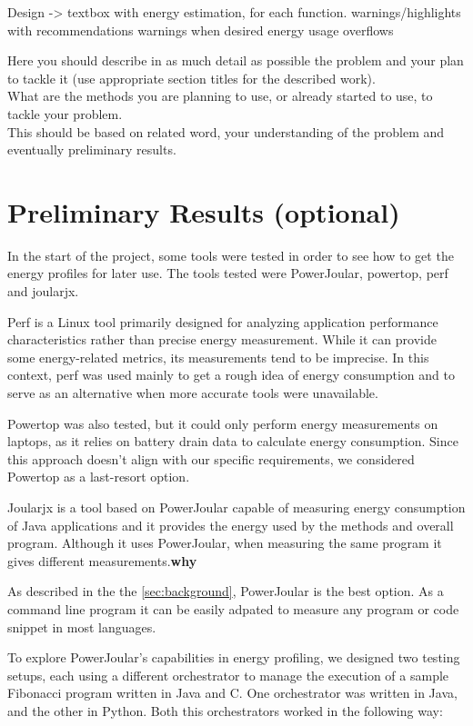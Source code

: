 \documentclass[sigplan]{acmart}
\begin{document}
Design -> textbox with energy estimation, for each function. 
          warnings/highlights with recommendations
          warnings when desired energy usage overflows 


Here you should describe in as much detail as possible the problem and your plan to tackle it (use appropriate section titles for the described work). \\

What are the methods you are planning to use, or already started to use, to tackle your problem. \\

This should be based on related word, your understanding of the problem and eventually preliminary results.

\section{Preliminary Results (optional)} \label{sec:preliminaryresults}

In the start of the project, some tools were tested in order to see how to get the energy profiles for later use. The tools tested were PowerJoular, powertop, perf and joularjx.

Perf is a Linux tool primarily designed for analyzing application performance characteristics rather than precise energy measurement. While it can provide some energy-related metrics, its measurements tend to be imprecise. In this context, perf was used mainly to get a rough idea of energy consumption and to serve as an alternative when more accurate tools were unavailable.

Powertop was also tested, but it could only perform energy measurements on laptops, as it relies on battery drain data to calculate energy consumption. Since this approach doesn't align with our specific requirements, we considered Powertop as a last-resort option.

Joularjx is a tool based on PowerJoular capable of measuring energy consumption of Java applications and it provides the energy used by the methods and overall program. Although it uses PowerJoular, when measuring the same program it gives different measurements.\textbf{why}

As described in the the \ref{sec:background}, PowerJoular is the best option. As a command line program it can be easily adpated to measure any program or code snippet in most languages.

To explore PowerJoular’s capabilities in energy profiling, we designed two testing setups, each using a different orchestrator to manage the execution of a sample Fibonacci program written in Java and C. One orchestrator was written in Java, and the other in Python. Both this orchestrators worked in the following way: \\
\end{document}
